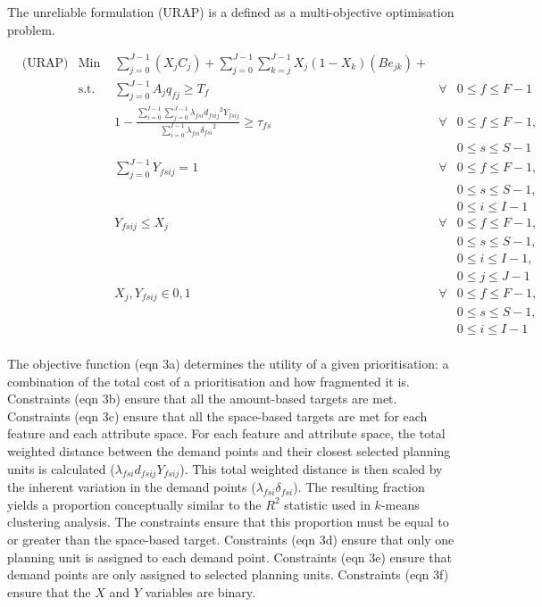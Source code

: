 \documentclass[11pt,]{article}
\begin{document}
The unreliable formulation (URAP) is a defined as a multi-objective
optimisation problem.

\begin{align*}
& \text{(URAP)} & \text{Min } & \sum_{j=0}^{J-1} \left( X_j C_j \right) + \sum_{j=0}^{J-1} \sum_{k=j}^{J-1} X_j \left( 1-X_k \right) \left( B e_{jk} \right) + & & \tag*{eqn 3a} \\
%
& & \text{s.t. } & \sum_{j=0}^{J-1} A_j q_{fj} \geq T_{f} & \forall & 0 \leq f \leq F-1 \tag*{eqn 3b}\\
%
& & & 1 - \frac{\sum_{i=0}^{I-1} \sum_{j=0}^{J-1} \lambda_{fsi} {d_{fsij}}^{2} Y_{fsij}}{\sum_{i=0}^{I-1} \lambda_{fsi} {\delta_{fsi}}^{2}} \geq \tau_{fs} & \forall & 0 \leq f \leq F-1, \tag*{eqn 3c}\\
& & & & & 0 \leq s \leq S-1\\
%
& & & \sum_{j=0}^{J-1} Y_{fsij} = 1 & \forall & 0 \leq f \leq F-1, \tag*{eqn 3d}\\
& & & & & 0 \leq s \leq S-1, \\
& & & & & 0 \leq i \leq I-1\\
%
& & & Y_{fsij} \leq X_j & \forall & 0 \leq f \leq F-1, \tag*{eqn 3e}\\
& & & & & 0 \leq s \leq S-1, \\
& & & & & 0 \leq i \leq I-1,\\
& & & & & 0 \leq j \leq J-1\\
%
& & & X_j, Y_{fsij} \in {0,1} & \forall & 0 \leq f \leq F-1, \tag*{eqn 3f}\\
& & & & & 0 \leq s \leq S-1,\\
& & & & & 0 \leq i \leq I-1\\
%
\end{align*}

The objective function (eqn 3a) determines the utility of a given
prioritisation: a combination of the total cost of a prioritisation and
how fragmented it is. Constraints (eqn 3b) ensure that all the
amount-based targets are met. Constraints (eqn 3c) ensure that all the
space-based targets are met for each feature and each attribute space.
For each feature and attribute space, the total weighted distance
between the demand points and their closest selected planning units is
calculated ($\lambda_{fsi} d_{fsij} Y_{fsij}$). This total weighted
distance is then scaled by the inherent variation in the demand points
($\lambda_{fsi} \delta_{fsi}$). The resulting fraction yields a
proportion conceptually similar to the $R^2$ statistic used in $k$-means
clustering analysis. The constraints ensure that this proportion must be
equal to or greater than the space-based target. Constraints (eqn 3d)
ensure that only one planning unit is assigned to each demand point.
Constraints (eqn 3e) ensure that demand points are only assigned to
selected planning units. Constraints (eqn 3f) ensure that the $X$ and
$Y$ variables are binary.
\end{document}
